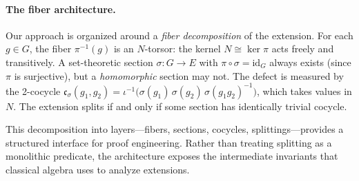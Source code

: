 \documentclass[11pt]{article}
\newcommand{\id}{\mathrm{id}}
\newcommand{\cocy}{\mathfrak{c}}
\begin{document}
\paragraph{The fiber architecture.}
Our approach is organized around a \emph{fiber decomposition} of the extension.
For each $g \in G$, the fiber $\pi^{-1}(g)$ is an $N$-torsor: the kernel $N \cong
\ker\pi$ acts freely and transitively.  A set-theoretic section $\sigma : G \to E$
with $\pi \circ \sigma = \id_G$ always exists (since $\pi$ is surjective), but a
\emph{homomorphic} section may not.  The defect is measured by the 2-cocycle
$\cocy_\sigma(g_1, g_2) = \iota^{-1}\bigl(\sigma(g_1)\,\sigma(g_2)\,
\sigma(g_1 g_2)^{-1}\bigr)$, which takes values in $N$.  The extension splits if
and only if some section has identically trivial cocycle.

This decomposition into layers---fibers, sections, cocycles, splittings---provides
a structured interface for proof engineering.  Rather than treating splitting as a
monolithic predicate, the architecture exposes the intermediate invariants that
classical algebra uses to analyze extensions.
\end{document}
